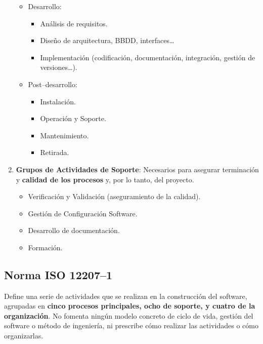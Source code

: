 \begin{enumerate}
\begin{itemize}
\begin{itemize}
                    \end{itemize}
              \item Desarrollo:
                    \begin{itemize}
                        \item Análisis de requisitos.
                        \item Diseño de arquitectura, BBDD, interfaces\ldots
                        \item Implementación (codificación, documentación, integración, gestión de versiones\ldots).
                    \end{itemize}
              \item Post--desarrollo:
                    \begin{itemize}
                        \item Instalación.
                        \item Operación y Soporte.
                        \item Mantenimiento.
                        \item Retirada.
                    \end{itemize}
          \end{itemize}
    \item \textbf{Grupos de Actividades de Soporte}: Necesarios para asegurar terminación y \textbf{calidad de los procesos} y, por lo tanto, del proyecto.
          \begin{itemize}
              \item Verificación y Validación (aseguramiento de la calidad).
              \item Gestión de Configuración Software.
              \item Desarrollo de documentación.
              \item Formación.
          \end{itemize}
\end{enumerate}

\subsection{Norma ISO 12207--1}
Define una serie de actividades que se realizan en la construcción del software, agrupadas en \textbf{cinco procesos principales, ocho de soporte, y cuatro de la organización}. No fomenta ningún modelo concreto de ciclo de vida, gestión del software o método de ingeniería, ni prescribe cómo realizar las actividades o cómo organizarlas.

